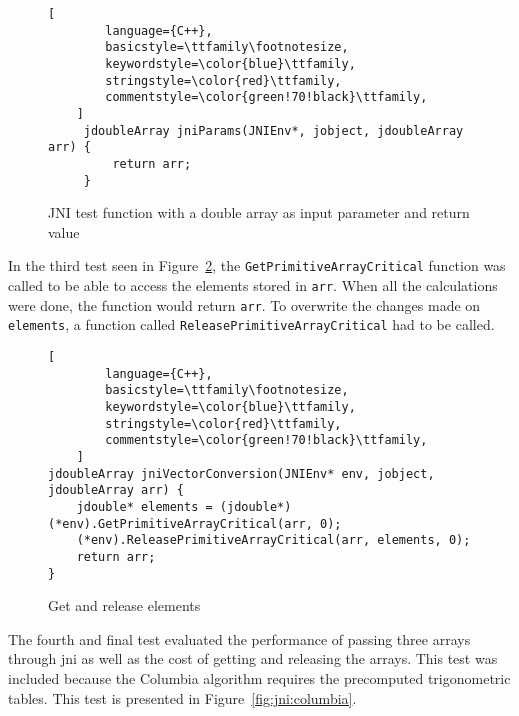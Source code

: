 \begin{figure}[H]
\begin{lstlisting}[
        language={C++},
        basicstyle=\ttfamily\footnotesize,
        keywordstyle=\color{blue}\ttfamily,
        stringstyle=\color{red}\ttfamily,
        commentstyle=\color{green!70!black}\ttfamily,
    ]
     jdoubleArray jniParams(JNIEnv*, jobject, jdoubleArray arr) {
         return arr;
     }
\end{lstlisting}
\caption{JNI test function with a double array as input parameter and return value}
\label{fig:jni:params}
\end{figure}

In the third test seen in Figure~\ref{fig:jni:conversion}, the \texttt{GetPrimitiveArrayCritical} function was called to be able to access the elements stored in \texttt{arr}. When all the calculations were done, the function would return \texttt{arr}. To overwrite the changes made on \texttt{elements}, a function called \texttt{ReleasePrimitiveArrayCritical} had to be called.

\begin{figure}[H]
\begin{lstlisting}[
        language={C++},
        basicstyle=\ttfamily\footnotesize,
        keywordstyle=\color{blue}\ttfamily,
        stringstyle=\color{red}\ttfamily,
        commentstyle=\color{green!70!black}\ttfamily,
    ]
jdoubleArray jniVectorConversion(JNIEnv* env, jobject, jdoubleArray arr) {
    jdouble* elements = (jdouble*)(*env).GetPrimitiveArrayCritical(arr, 0);
    (*env).ReleasePrimitiveArrayCritical(arr, elements, 0);
    return arr;
}
\end{lstlisting}
\caption{Get and release elements}
\label{fig:jni:conversion}
\end{figure}

The fourth and final test evaluated the performance of passing three arrays through \gls{jni} as well as the cost of getting and releasing the arrays. This test was included because the Columbia algorithm requires the precomputed trigonometric tables. This test is presented in Figure~\ref{fig:jni:columbia}.

